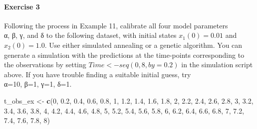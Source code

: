 \documentclass[
]{article}
\newenvironment{Shaded}{\begin{snugshade}}{\end{snugshade}}
\newcommand{\DecValTok}[1]{\textcolor[rgb]{0.00,0.00,0.81}{#1}}
\newcommand{\FloatTok}[1]{\textcolor[rgb]{0.00,0.00,0.81}{#1}}
\newcommand{\FunctionTok}[1]{\textcolor[rgb]{0.13,0.29,0.53}{\textbf{#1}}}
\newcommand{\NormalTok}[1]{#1}
\newcommand{\OtherTok}[1]{\textcolor[rgb]{0.56,0.35,0.01}{#1}}
\begin{document}
\paragraph{Exercise 3}\label{exercise-3}

Following the process in Example 11, calibrate all four model
parameters\\
α, β, γ, and δ to the following dataset, with initial states
\(x_1(0)=0.01\) and \(x_2(0)=1.0\). Use either simulated annealing or a
genetic algorithm. You can generate a simulation with the predictions at
the time-points corresponding to the observations by setting
\(Time <- seq(0, 8, by =0.2)\) in the simulation script above. If you
have trouble finding a suitable initial guess, try\\
α=10, β=1, γ=1, δ=1.

\begin{Shaded}
\begin{Highlighting}[]
\NormalTok{t\_obs\_ex }\OtherTok{\textless{}{-}} \FunctionTok{c}\NormalTok{(}\DecValTok{0}\NormalTok{, }\FloatTok{0.2}\NormalTok{, }\FloatTok{0.4}\NormalTok{, }\FloatTok{0.6}\NormalTok{, }\FloatTok{0.8}\NormalTok{, }\DecValTok{1}\NormalTok{, }\FloatTok{1.2}\NormalTok{, }\FloatTok{1.4}\NormalTok{, }\FloatTok{1.6}\NormalTok{, }\FloatTok{1.8}\NormalTok{, }\DecValTok{2}\NormalTok{,}
    \FloatTok{2.2}\NormalTok{, }\FloatTok{2.4}\NormalTok{, }\FloatTok{2.6}\NormalTok{, }\FloatTok{2.8}\NormalTok{, }\DecValTok{3}\NormalTok{, }\FloatTok{3.2}\NormalTok{, }\FloatTok{3.4}\NormalTok{, }\FloatTok{3.6}\NormalTok{, }\FloatTok{3.8}\NormalTok{, }\DecValTok{4}\NormalTok{, }\FloatTok{4.2}\NormalTok{, }\FloatTok{4.4}\NormalTok{, }\FloatTok{4.6}\NormalTok{,}
    \FloatTok{4.8}\NormalTok{, }\DecValTok{5}\NormalTok{, }\FloatTok{5.2}\NormalTok{, }\FloatTok{5.4}\NormalTok{, }\FloatTok{5.6}\NormalTok{, }\FloatTok{5.8}\NormalTok{, }\DecValTok{6}\NormalTok{, }\FloatTok{6.2}\NormalTok{, }\FloatTok{6.4}\NormalTok{, }\FloatTok{6.6}\NormalTok{, }\FloatTok{6.8}\NormalTok{, }\DecValTok{7}\NormalTok{, }\FloatTok{7.2}\NormalTok{,}
    \FloatTok{7.4}\NormalTok{, }\FloatTok{7.6}\NormalTok{, }\FloatTok{7.8}\NormalTok{, }\DecValTok{8}\NormalTok{)}


\end{Highlighting}
\end{Shaded}
\end{document}
